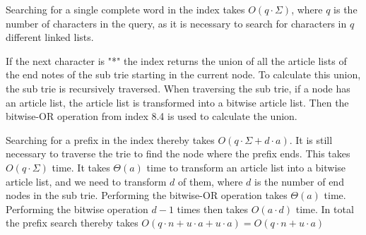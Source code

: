 Searching for a single complete word in the index takes $O(q\cdot \Sigma)$, where $q$ is the number of characters in the query, as it is necessary to search for characters in $q$ different linked lists. 

If the next character is "*" the index returns the union of all the article lists of the end notes of the sub trie starting in the current node. To calculate this union, the sub trie is recursively traversed. When traversing the sub trie, if a node has an article list, the article list is transformed into a bitwise article list. Then the bitwise-OR operation from index 8.4 is used to calculate the union.

Searching for a prefix in the index thereby takes $O(q\cdot \Sigma + 
 d \cdot a)$. It is still necessary to traverse the trie to find the node where the prefix ends. This takes $O(q\cdot \Sigma)$ time. It takes $\Theta(a)$ time to transform an article list into a bitwise article list, and we need to transform $d$ of them, where $d$ is the number of end nodes in the sub trie. Performing the bitwise-OR operation takes $\Theta(a)$ time. Performing the bitwise operation $d-1$ times then takes $O(a \cdot d)$ time. In total the prefix search thereby takes $O(q\cdot n + u\cdot a + u\cdot a) = O(q\cdot n + u\cdot a)$

 
